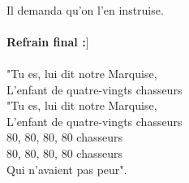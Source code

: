 \\Il demanda qu'on l'en instruise.
\\\\\textbf{Refrain final :}]
\\\\"Tu es, lui dit notre Marquise,
\\L'enfant de quatre-vingts chasseurs
\\"Tu es, lui dit notre Marquise,
\\L'enfant de quatre-vingts chasseurs
\\80, 80, 80, 80 chasseurs
\\80, 80, 80, 80 chasseurs
\\Qui n'avaient pas peur".
